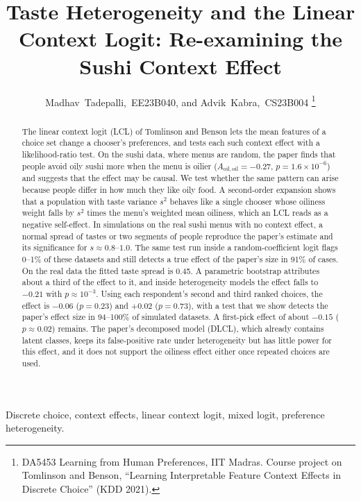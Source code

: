 \documentclass[11pt,journal,a4paper]{IEEEtran}
\begin{document}
\title{Taste Heterogeneity and the Linear Context Logit: Re-examining the Sushi Context Effect}

\author{Madhav~Tadepalli,~EE23B040, and Advik~Kabra,~CS23B004%
\thanks{DA5453 Learning from Human Preferences, IIT Madras. Course project on Tomlinson and Benson,
``Learning Interpretable Feature Context Effects in Discrete Choice'' (KDD 2021).}}

\maketitle

\begin{abstract}
The linear context logit (LCL) of Tomlinson and Benson lets the mean features of a choice set change a
chooser's preferences, and tests each such context effect with a likelihood-ratio test. On the sushi data,
where menus are random, the paper finds that people avoid oily sushi more when the menu is oilier
($A_{\mathrm{oil,oil}}=-0.27$, $p=1.6\times10^{-6}$) and suggests that the effect may be causal. We test whether
the same pattern can arise because people differ in how much they like oily food. A second-order expansion
shows that a population with taste variance $s^2$ behaves like a single chooser whose oiliness weight falls by
$s^2$ times the menu's weighted mean oiliness, which an LCL reads as a negative self-effect. In simulations on
the real sushi menus with no context effect, a normal spread of tastes or two segments of people reproduce the
paper's estimate and its significance for $s\approx0.8$--$1.0$. The same test run inside a random-coefficient
logit flags 0--1\% of these datasets and still detects a true effect of the paper's size in 91\% of cases. On the
real data the fitted taste spread is 0.45. A parametric bootstrap attributes about a third of the effect to it,
and inside heterogeneity models the effect falls to $-0.21$ with $p\approx10^{-3}$. Using each respondent's
second and third ranked choices, the effect is $-0.06$ ($p=0.23$) and $+0.02$ ($p=0.73$), with a test that we
show detects the paper's effect size in 94--100\% of simulated datasets. A first-pick effect of about $-0.15$
($p\approx0.02$) remains. The paper's decomposed model (DLCL), which already contains latent classes, keeps its
false-positive rate under heterogeneity but has little power for this effect, and it does not support the
oiliness effect either once repeated choices are used.
\end{abstract}

\begin{IEEEkeywords}
Discrete choice, context effects, linear context logit, mixed logit, preference heterogeneity.
\end{IEEEkeywords}
\end{document}
